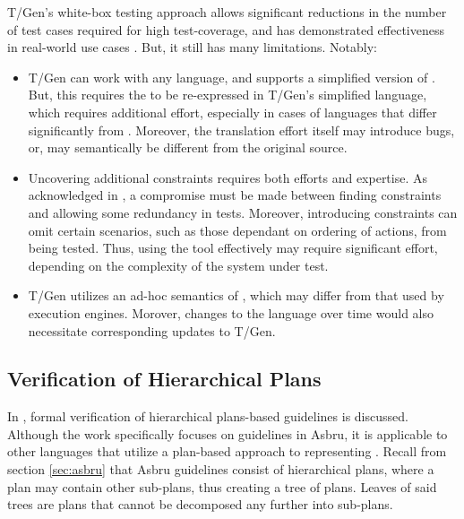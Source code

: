 T/Gen's white-box testing approach allows significant reductions in the
number of test cases required for high test-coverage, and has demonstrated
effectiveness in real-world use cases \cite{MillerJAMIA01}. But, it still has
many limitations. Notably:
\begin{itemize}
  \item T/Gen can work with any \CIG{} language, and supports
  a simplified version of \GLIF{}. But, this requires the \CIG{} to
  be re-expressed in T/Gen's simplified language,
  which requires additional effort, especially in cases of languages that differ
    significantly from \GLIF{}. Moreover, the translation effort itself may
    introduce bugs, or, may semantically be different from the original source.
  \item Uncovering additional constraints requires both efforts and expertise.
    As acknowledged in \cite{MillerJAMIA01}, a compromise must be made between
    finding constraints and allowing some redundancy in tests. Moreover,
    introducing constraints can omit certain scenarios, such
    as those dependant on ordering of actions, from being tested.
    Thus, using the tool effectively may require significant effort, depending
    on the complexity of the system under test.
  \item T/Gen utilizes an ad-hoc semantics of \GLIF{}, which may differ from
    that used by \GLIF{} execution engines. Morover, changes to the \GLIF{} language
    over time would also necessitate corresponding updates to T/Gen.
\end{itemize}

\subsection{Verification of Hierarchical Plans}\label{sec:asbru-verification}

In \cite{DuftschmidAIM01}, formal verification of hierarchical plans-based
guidelines is discussed. Although the work specifically focuses on guidelines in
Asbru, it is applicable to other languages that utilize a plan-based approach
to representing \BPGs{}. Recall from section \ref{sec:asbru} that Asbru guidelines
consist of hierarchical plans, where a plan may contain other sub-plans,
thus creating a tree of plans. Leaves of said trees are plans that cannot
be decomposed any further into sub-plans.

